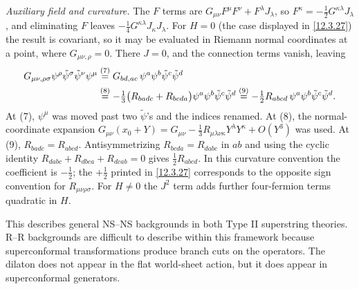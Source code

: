 \begin{tcolorbox}[breakable]
\begin{remark}
		\emph{Auxiliary field and curvature.} The $F$ terms are $G_{\mu\nu}F^{\mu}F^{\nu}+F^{\lambda}J_{\lambda}$, so $F^{\kappa}=-\frac12G^{\kappa\lambda}J_{\lambda}$, and eliminating $F$ leaves $-\frac14G^{\kappa\lambda}J_{\kappa}J_{\lambda}$. For $H=0$ (the case displayed in \eqref{12.3.27}) the result is covariant, so it may be evaluated in Riemann normal coordinates at a point, where $G_{\mu\nu,\rho}=0$. There $J=0$, and the connection terms vanish, leaving
		\begin{align*}
			G_{\mu\nu,\rho\sigma}\psi^{\rho}\tilde\psi^{\sigma}\tilde\psi^{\nu}\psi^{\mu}
			&\overset{(7)}{=} G_{bd,ac}\,\psi^{a}\psi^{b}\tilde\psi^{c}\tilde\psi^{d}\\
			&\overset{(8)}{=} -\tfrac13\bigl(R_{badc}+R_{bcda}\bigr)\psi^{a}\psi^{b}\tilde\psi^{c}\tilde\psi^{d}
			\overset{(9)}{=} -\tfrac12R_{abcd}\,\psi^{a}\psi^{b}\tilde\psi^{c}\tilde\psi^{d} .
		\end{align*}
		At (7), $\psi^{\mu}$ was moved past two $\tilde\psi$'s and the indices renamed. At (8), the normal-coordinate expansion $G_{\mu\nu}(x_{0}+Y)=G_{\mu\nu}-\frac13R_{\mu\lambda\nu\kappa}Y^{\lambda}Y^{\kappa}+O(Y^{3})$ was used. At (9), $R_{badc}=R_{abcd}$. Antisymmetrizing $R_{bcda}=R_{dabc}$ in $ab$ and using the cyclic identity $R_{dabc}+R_{dbca}+R_{dcab}=0$ gives $\frac12R_{abcd}$. In this curvature convention the coefficient is $-\frac12$; the $+\frac12$ printed in \eqref{12.3.27} corresponds to the opposite sign convention for $R_{\mu\nu\rho\sigma}$. For $H\neq0$ the $J^{2}$ term adds further four-fermion terms quadratic in $H$.
	\end{remark}
\end{tcolorbox}
This describes general NS--NS backgrounds in both Type II superstring theories. R--R backgrounds are difficult to describe within this framework because superconformal transformations produce branch cuts on the operators. The dilaton does not appear in the flat world-sheet action, but it does appear in superconformal generators.

